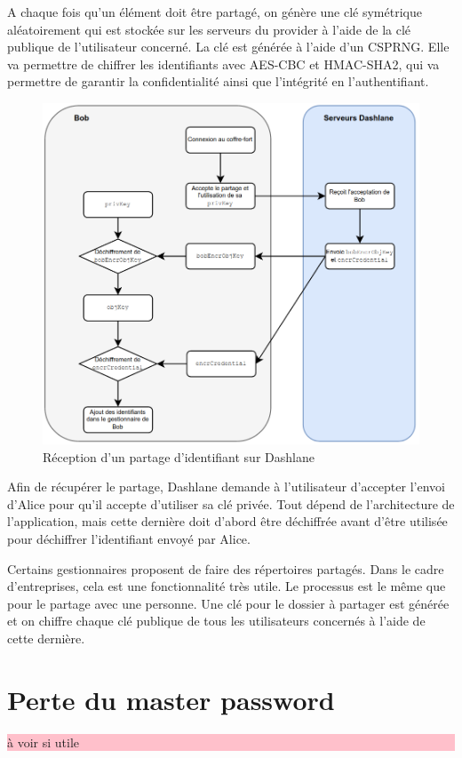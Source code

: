 A chaque fois qu'un élément doit être partagé, on génère une clé symétrique aléatoirement qui est stockée sur les serveurs du provider à l'aide de la clé publique de l'utilisateur concerné. La clé est générée à l'aide d'un CSPRNG. Elle va permettre de chiffrer les identifiants avec AES-CBC et HMAC-SHA2, qui va permettre de garantir la confidentialité ainsi que l'intégrité en l'authentifiant.
\begin{figure}[h!]
	\includegraphics[width=15.5cm]{images/dashlane_share_bob.png}
	\centering
	\caption{Réception d'un partage d'identifiant sur Dashlane}
\end{figure}

Afin de récupérer le partage, Dashlane demande à l'utilisateur d'accepter l'envoi d'Alice pour qu'il accepte d'utiliser sa clé privée. Tout dépend de l'architecture de l'application, mais cette dernière doit d'abord être déchiffrée avant d'être utilisée pour déchiffrer l'identifiant envoyé par Alice.

Certains gestionnaires proposent de faire des répertoires partagés. Dans le cadre d'entreprises, cela est une fonctionnalité très utile. Le processus est le même que pour le partage avec une personne. Une clé pour le dossier à partager est générée et on chiffre chaque clé publique de tous les utilisateurs concernés à l'aide de cette dernière.
\section{Perte du master password}
\colorbox{pink}{\parbox{15cm}{à voir si utile}}
